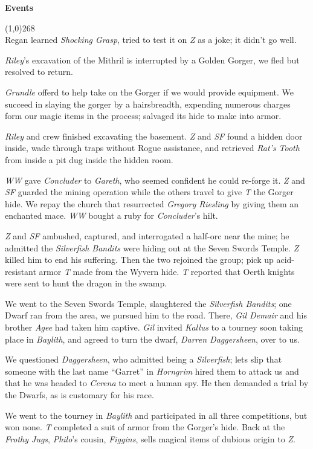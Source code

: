 \documentclass[letterpaper]{article}
\newcommand{\colline}{\line(1,0){268} \\}
\newcommand{\e}[1]{\emph{#1}}
\newcommand{\B}[1]{\textbf{#1}}
\newenvironment{notesection}[1]
{ {\huge \B{#1}} \par
\vspace{-0.75em}
\colline
\begingroup\fontsize{9pt}{12pt}\selectfont}
{\endgroup}
\begin{document}
\begin{notesection}{Events}
Regan learned \e{Shocking Grasp}, tried to test it on \e{Z} as a joke; it didn't go well.

\e{Riley}'s excavation of the Mithril is interrupted by a Golden Gorger, we fled but resolved to return.

\e{Grundle} offerd to help take on the Gorger if we would provide equipment. We succeed in slaying the gorger by a hairsbreadth, expending numerous charges form our magic items in the process; salvaged its hide to make into armor.

\e{Riley} and crew finished excavating the basement. \e{Z} and \e{SF} found a hidden door inside, wade through traps without Rogue assistance, and retrieved \e{Rat's Tooth} from inside a pit dug inside the hidden room.

\e{WW} gave \e{Concluder} to \e{Gareth}, who seemed confident he could re-forge it.  \e{Z} and \e{SF} guarded the mining operation while the others travel to give \e{T} the Gorger hide. We repay the church that resurrected \e{Gregory Riesling} by giving them an enchanted mace. \e{WW} bought a ruby for \e{Concluder}'s hilt.

\e{Z} and \e{SF} ambushed, captured, and interrogated a half-orc near the mine; he admitted the \e{Silverfish Bandits} were hiding out at the Seven Swords Temple. \e{Z} killed him to end his suffering. Then the two rejoined the group; pick up acid-resistant armor \e{T} made from the Wyvern hide.  \e{T} reported that Oerth knights were sent to hunt the dragon in the swamp.

We went to the Seven Swords Temple, slaughtered the \e{Silverfish Bandits}; one Dwarf ran from the area, we pursued him to the road. There, \e{Gil Demair} and his brother \e{Agee} had taken him captive. \e{Gil} invited \e{Kallus} to a tourney soon taking place in \e{Baylith}, and agreed to turn the dwarf, \e{Darren Daggersheen}, over to us.

We questioned \e{Daggersheen}, who admitted being a \e{Silverfish}; lets slip that someone with the last name ``Garret'' in \e{Horngrim} hired them to attack us and that he was headed to \e{Cerena} to meet a human spy.  He then demanded a trial by the Dwarfs, as is customary for his race.

We went to the tourney in \e{Baylith} and participated in all three competitions, but won none. \e{T} completed a suit of armor from the Gorger's hide. Back at the \e{Frothy Jugs}, \e{Philo}'s cousin, \e{Figgins}, sells magical items of dubious origin to \e{Z}.


\end{notesection}
\end{document}
